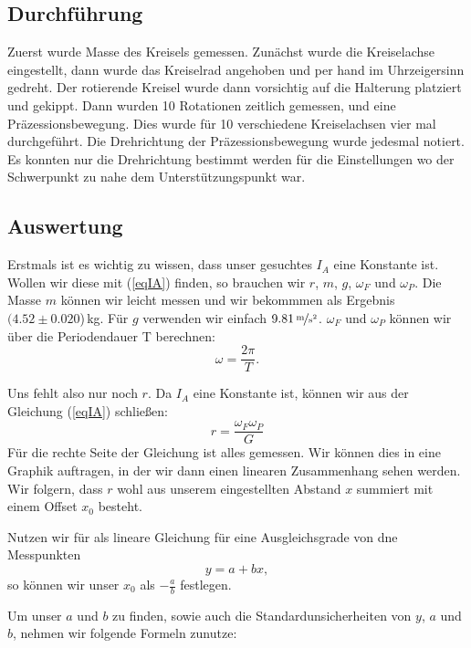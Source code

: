 \documentclass[11pt,a4paper]{article}
\begin{document}
\subsection{Durchführung}

Zuerst wurde Masse des Kreisels gemessen. Zunächst wurde die Kreiselachse eingestellt, dann wurde das Kreiselrad angehoben und per hand im Uhrzeigersinn gedreht. Der rotierende Kreisel wurde dann vorsichtig auf die Halterung platziert und gekippt. Dann wurden 10 Rotationen zeitlich gemessen, und eine Präzessionsbewegung. Dies wurde für 10 verschiedene Kreiselachsen vier mal durchgeführt. Die Drehrichtung der Präzessionsbewegung wurde jedesmal notiert. Es konnten nur die Drehrichtung bestimmt werden für die Einstellungen wo der Schwerpunkt zu nahe dem Unterstützungspunkt war.

\subsection{Auswertung}

Erstmals ist es wichtig zu wissen, dass unser gesuchtes $I_A$ eine Konstante ist. Wollen wir diese mit (\ref{eqIA}) finden, so brauchen wir $r$, $m$, $g$, $\omega_F$ und $\omega_P$. Die Masse $m$ k\"onnen wir leicht messen und wir bekommmen als Ergebnis $(4.52\pm0.020$)\,kg. F\"ur $g$ verwenden wir einfach $9.81\,\nicefrac{\mathrm{m}}{\mathrm{s}^2}$. $\omega_F$ und $\omega_P$ k\"onnen wir \"uber die Periodendauer T berechnen: 
\[
\omega=\frac{2\pi}{T}.
\]

Uns fehlt also nur noch $r$. Da $I_A$ eine Konstante ist, k\"onnen wir aus der Gleichung (\ref{eqIA}) schlie\ss en:
\begin{equation}
r=\frac{\omega_F\omega_P}{G}\label{eqgraph}
\end{equation}
F\"ur die rechte Seite der Gleichung ist alles gemessen. Wir k\"onnen dies in eine Graphik auftragen, in der wir dann einen linearen Zusammenhang sehen werden. Wir folgern, dass $r$ wohl aus unserem eingestellten Abstand $x$ summiert mit einem Offset $x_0$ besteht.

Nutzen wir f\"ur als lineare Gleichung f\"ur eine Ausgleichsgrade von dne Messpunkten
\[
y=a+bx,
\]
so k\"onnen wir unser $x_0$ als $-\frac{a}{b}$ festlegen.

Um unser $a$ und $b$ zu finden, sowie auch die Standardunsicherheiten von $y$, $a$ und $b$, nehmen wir folgende Formeln zunutze:
\end{document}
